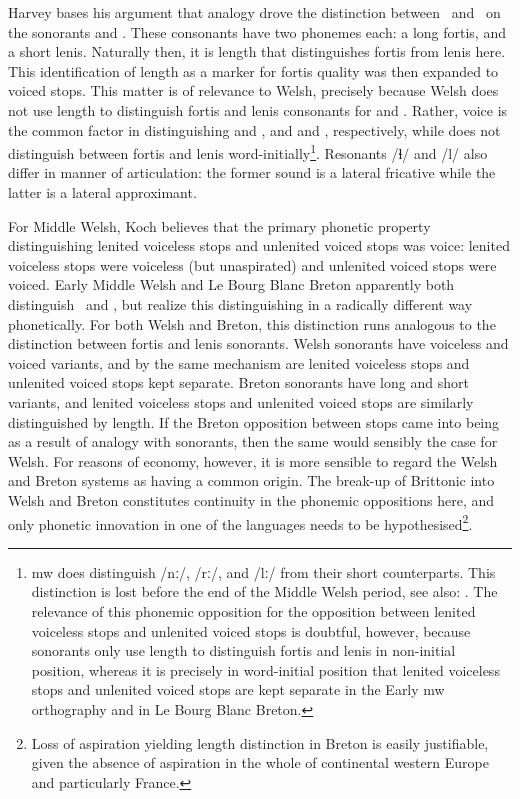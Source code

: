 Harvey bases his argument that analogy drove the distinction between \lT\ and \xD\ on the sonorants and . These consonants have two phonemes each: a long fortis, and a short lenis. Naturally then, it is length that distinguishes fortis from lenis here. This identification of length as a marker for fortis quality was then expanded to voiced stops. This matter is of relevance to Welsh, precisely because Welsh does not use length to distinguish fortis and lenis consonants for  and . Rather, voice is the common factor in distinguishing  and , and  and , respectively, while  does not distinguish between fortis and lenis word-initially\footnote{\gls{mw} does distinguish /nː/, /rː/, and /lː/ from their short counterparts. This distinction is lost before the end of the Middle Welsh period, see also: \textcite[127--128]{schumacher_mittel-_2011}. The relevance of this phonemic opposition for the opposition between lenited voiceless stops and unlenited voiced stops is doubtful, however, because sonorants only use length to distinguish fortis and lenis in non-initial position, whereas it is precisely in word-initial position that lenited voiceless stops and unlenited voiced stops are kept separate in the Early \gls{mw} orthography and in Le Bourg Blanc Breton.}. Resonants   /ɬ/ and  /l/ also differ in manner of articulation: the former sound is a lateral fricative while the latter is a lateral approximant. 

For Middle Welsh, Koch \parencite*{koch_*cothairche_1990} believes that the primary phonetic property distinguishing lenited voiceless stops and unlenited voiced stops was voice: lenited voiceless stops were voiceless (but unaspirated) and unlenited voiced stops were voiced. Early Middle Welsh and Le Bourg Blanc Breton apparently both distinguish \lT\ and \xD, but realize this distinguishing in a radically different way phonetically. For both Welsh and Breton, this distinction runs analogous to the distinction between fortis and lenis sonorants. Welsh sonorants have voiceless and voiced variants, and by the same mechanism are lenited voiceless stops and unlenited voiced stops kept separate. Breton sonorants have long and short variants, and lenited voiceless stops and unlenited voiced stops are similarly distinguished by length. If the Breton opposition between stops came into being as a result of analogy with sonorants, then the same would sensibly the case for Welsh. For reasons of economy, however, it is more sensible to regard the Welsh and Breton systems as having a common origin. The break-up of Brittonic into Welsh and Breton constitutes continuity in the phonemic oppositions here, and only phonetic innovation in one of the languages needs to be hypothesised\footnote{Loss of aspiration yielding length distinction in Breton is easily justifiable, given the absence of aspiration in the whole of continental western Europe and particularly France.}. 

